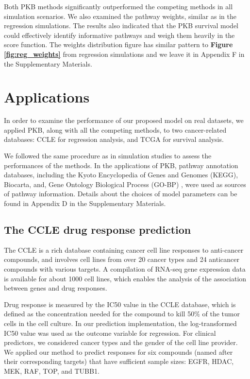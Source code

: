 \documentclass[a4paper,12pt]{article}
\begin{document}
Both PKB methods significantly outperformed the competing methods in all  simulation scenarios. We also examined the pathway weights, similar as in the regression simulations. The results also indicated that the PKB survival model could effectively identify informative pathways and weigh them heavily in the score function. The weights distribution figure has similar pattern to \textbf{Figure \ref{fig:reg_weights}} from regression simulations and we leave it in Appendix F in the Supplementary Materials.

\section{Applications}\label{results}
In order to examine the performance of our proposed model on real datasets, we applied PKB, along with all the competing methods, to two cancer-related databases: CCLE\citep{barretina2012cancer} for regression analysis, and TCGA for survival analysis. 

We followed the same procedure as in simulation studies to assess the performances of the methods. In the applications of PKB, pathway annotation databases, including the Kyoto Encyclopedia of Genes and Genomes (KEGG), \citep{kanehisa2000kegg} Biocarta, \citep{nishimura2001biocarta} and, Gene Ontology Biological Process (GO-BP) \citep{ashburner2000gene, gene2016expansion}, were used as sources of pathway information. Details about the choices of model parameters can be found in Appendix D in the Supplementary Materials.

\subsection{The CCLE drug response prediction}

The CCLE is a rich database containing cancer cell line responses to anti-cancer compounds, and involves cell lines from over 20 cancer types and 24 anticancer compounds with various targets. A compilation of RNA-seq gene expression data is available for about 1000 cell lines, which enables the analysis of the association between genes and drug responses. 

Drug response is measured by the IC50 value in the CCLE database, which is defined as the concentration needed for the compound to kill 50$\%$ of the tumor cells in the cell culture. In our prediction implementation, the log-transformed IC50 value was used as the outcome variable for regression. For clinical predictors, we considered cancer types and the gender of the cell line provider. We applied our method to predict responses for six compounds (named after their corresponding targets) that have sufficient sample sizes: EGFR, HDAC, MEK, RAF, TOP, and TUBB1. 
\end{document}
